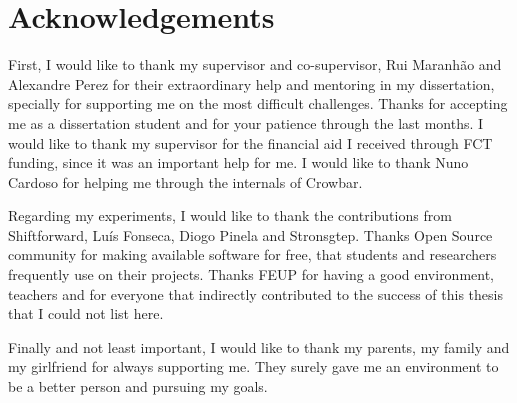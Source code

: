 \chapter*{Acknowledgements}

First, I would like to thank my supervisor and co-supervisor, Rui Maranhão and Alexandre Perez for their extraordinary help and mentoring in my dissertation, specially for supporting me on the most difficult challenges. Thanks for accepting me as a dissertation student and for your patience through the last months. I would like to thank my supervisor for the financial aid I received through FCT funding, since it was an important help for me. I would like to thank Nuno Cardoso for helping me through the internals of Crowbar.

Regarding my experiments, I would like to thank the contributions from Shiftforward, Luís Fonseca, Diogo Pinela and Stronsgtep. Thanks Open Source community for making available software for free, that students and researchers frequently use on their projects. Thanks FEUP for having a good environment, teachers and for everyone that indirectly contributed to the success of this thesis that I could not list here.


Finally and not least important, I would like to thank my parents, my family and my girlfriend for always supporting me. They surely gave me an environment to be a better person and pursuing my goals.


\vspace{10mm}

